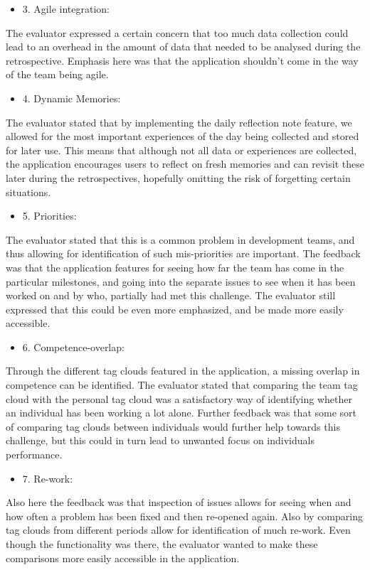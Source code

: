 \begin{itemize}
    \item 3. Agile integration: 
\end{itemize}
The evaluator expressed a certain concern that too much data collection could lead to an overhead in the amount of data that needed to be analysed during the retrospective. Emphasis here was that the application shouldn't come in the way of the team being agile. 

\begin{itemize}
    \item 4. Dynamic Memories:
\end{itemize}
 The evaluator stated that by implementing the daily reflection note feature, we allowed for the most important experiences of the day being collected and stored for later use. This means that although not all data or experiences are collected, the application encourages users to reflect on fresh memories and can revisit these later during the retrospectives, hopefully omitting the risk of forgetting certain situations. 

\begin{itemize}
    \item 5. Priorities: 
\end{itemize}
The evaluator stated that this is a common problem in development teams, and thus allowing for identification of such mis-priorities are important. The feedback was that the application features for seeing how far the team has come in the particular milestones, and going into the separate issues to see when it has been worked on and by who, partially had met this challenge. The evaluator still expressed that this could be even more emphasized, and be made more easily accessible. 

\begin{itemize}
    \item 6. Competence-overlap:  
\end{itemize}
Through the different tag clouds featured in the application, a missing overlap in competence can be identified. The evaluator stated that comparing the team tag cloud with the personal tag cloud was a satisfactory way of identifying whether an individual has been working a lot alone. Further feedback was that some sort of comparing tag clouds between individuals would further help towards this challenge, but this could in turn lead to unwanted focus on individuals performance.

\begin{itemize}
    \item 7. Re-work: 
\end{itemize}
 Also here the feedback was that inspection of issues allows for seeing when and how often a problem has been fixed and then re-opened again. Also by comparing tag clouds from different periods allow for identification of much re-work. Even though the functionality was there, the evaluator wanted to make these comparisons more easily accessible in the application.

